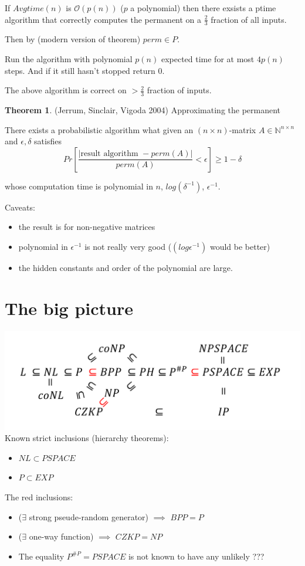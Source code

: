 \documentclass[a4paper,12pt]{article}
\theoremstyle{definition}
\newtheorem{theorem}[counter]{Theorem}
\theoremstyle{remark}
\newcommand{\N}{\mathbb{N}}
\begin{document}
If $Avgtime(n)$ is $\mathscr{O}(p(n))$ ($p$ a polynomial) then there exsists a ptime 
algorithm that correctly computes the permanent on a $\frac{2}{3}$ fraction of all inputs. 

Then by (modern version of theorem) $perm \in P$.

Run the algorithm with polynomial $p(n)$ expected time for at most $4 p(n)$ steps. 
And if it still hasn't stopped return 0.

The above algorithm is correct on $> \frac{2}{3}$ fraction of inputs.

\begin{theorem}
    (Jerrum, Sinclair, Vigoda 2004) Approximating the permanent

    There exists a probabilistic algorithm what given an $(n \times n)$-matrix $A \in \N^{n \times n}$ 
    and $\epsilon, \delta$ satisfies 
    \begin{equation*}
        Pr [\frac{|\text{result algorithm } - perm(A)|}{perm(A)} < \epsilon] \geq 1 - \delta
    \end{equation*}

    whose computation time is polynomial in $n$, $log(\delta^{-1})$, $\epsilon^{-1}$.

    Caveats:
    \begin{itemize}
        \item the result is for non-negative matrices
        \item polynomial in $\epsilon^{-1}$ is not really very good ($(log \epsilon^{-1})$ would be better)
        \item the hidden constants and order of the polynomial are large.
    \end{itemize}
\end{theorem}


\newpage
\section{The big picture}
\includegraphics[width=\textwidth]{img/TheBigPicture.png}
Known strict inclusions (hierarchy theorems):
\begin{itemize}
    \item $NL \subset PSPACE$
    \item $P \subset EXP$
\end{itemize}
The red inclusions:
\begin{itemize}
    \item ($\exists$ strong pseude-random generator) $\implies$ $BPP = P$
    \item ($\exists$ one-way function) $\implies$ $CZKP = NP$
    \item The equality $P^{\#P} = PSPACE$ is not known to have any unlikely ???
\end{itemize}
\end{document}
